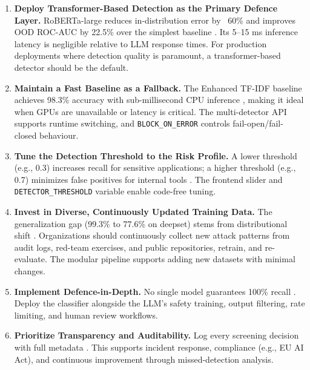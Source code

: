 \documentclass[12pt, letterpaper]{article}   %
\begin{document}
\begin{enumerate}
    \item \textbf{Deploy Transformer-Based Detection as the Primary Defence Layer.} RoBERTa-large reduces in-distribution error by ~60\% and improves OOD ROC-AUC by 22.5\% over the simplest baseline \cite{ref37}\cite{ref13}. Its 5--15 ms inference latency is negligible relative to LLM response times. For production deployments where detection quality is paramount, a transformer-based detector should be the default.

    \item \textbf{Maintain a Fast Baseline as a Fallback.} The Enhanced TF-IDF baseline achieves 98.3\% accuracy with sub-millisecond CPU inference \cite{ref33}\cite{ref1}, making it ideal when GPUs are unavailable or latency is critical. The multi-detector API supports runtime switching, and \texttt{BLOCK\_ON\_ERROR} controls fail-open/fail-closed behaviour.

    \item \textbf{Tune the Detection Threshold to the Risk Profile.} A lower threshold (e.g., 0.3) increases recall for sensitive applications; a higher threshold (e.g., 0.7) minimizes false positives for internal tools \cite{ref28}\cite{ref38}. The frontend slider and \texttt{DETECTOR\_THRESHOLD} variable enable code-free tuning.

    \item \textbf{Invest in Diverse, Continuously Updated Training Data.} The generalization gap (99.3\% to 77.6\% on deepset) stems from distributional shift \cite{ref28}\cite{ref10}. Organizations should continuously collect new attack patterns from audit logs, red-team exercises, and public repositories, retrain, and re-evaluate. The modular pipeline supports adding new datasets with minimal changes.

    \item \textbf{Implement Defence-in-Depth.} No single model guarantees 100\% recall \cite{ref38}\cite{ref18}. Deploy the classifier alongside the LLM's safety training, output filtering, rate limiting, and human review workflows.

    \item \textbf{Prioritize Transparency and Auditability.} Log every screening decision with full metadata \cite{ref32}. This supports incident response, compliance (e.g., EU AI Act), and continuous improvement through missed-detection analysis.
\end{enumerate}
\end{document}
